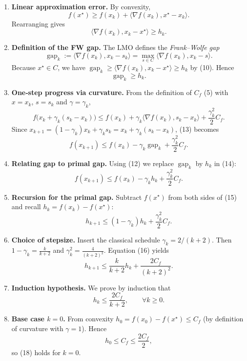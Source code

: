 \documentclass{article}
\newcommand{\gap}{\operatorname{gap}}
\begin{document}
\begin{enumerate}[label=[Step \arabic*],leftmargin=*]
\item \textbf{Linear approximation error.} By convexity,
\[
f(x^{\star})\ge f(x_{k})+\langle\nabla f(x_{k}),x^{\star}-x_{k}\rangle.
\tag{9}
\]
Rearranging gives
\[
\langle\nabla f(x_{k}),x_{k}-x^{\star}\rangle\ge h_{k}.
\tag{10}
\]

\item \textbf{Definition of the FW gap.} The LMO defines the \emph{Frank–Wolfe gap}
\[
\gap_{k}:=\langle\nabla f(x_{k}),x_{k}-s_{k}\rangle
          =\max_{s\in C}\langle\nabla f(x_{k}),x_{k}-s\rangle .
\tag{11}
\]
Because $x^{\star}\in C$, we have $\gap_{k}\ge\langle\nabla f(x_{k}),x_{k}-x^{\star}\rangle\ge h_{k}$ by (10). Hence
\[
\gap_{k}\ge h_{k}.
\tag{12}
\]

\item \textbf{One‑step progress via curvature.} From the definition of $C_{f}$ (5) with $x=x_{k}$, $s=s_{k}$ and $\gamma=\gamma_{k}$,
\[
f\big(x_{k}+\gamma_{k}(s_{k}-x_{k})\big)
\le f(x_{k})+\gamma_{k}\langle\nabla f(x_{k}),s_{k}-x_{k}\rangle
     +\frac{\gamma_{k}^{2}}{2}C_{f}.
\tag{13}
\]
Since $x_{k+1}=(1-\gamma_{k})x_{k}+\gamma_{k}s_{k}=x_{k}+\gamma_{k}(s_{k}-x_{k})$, (13) becomes
\[
f(x_{k+1})\le f(x_{k})-\gamma_{k}\gap_{k}+\frac{\gamma_{k}^{2}}{2}C_{f}.
\tag{14}
\]

\item \textbf{Relating gap to primal gap.} Using (12) we replace $\gap_{k}$ by $h_{k}$ in (14):
\[
f(x_{k+1})\le f(x_{k})-\gamma_{k}h_{k}+\frac{\gamma_{k}^{2}}{2}C_{f}.
\tag{15}
\]

\item \textbf{Recursion for the primal gap.} Subtract $f(x^{\star})$ from both sides of (15) and recall $h_{k}=f(x_{k})-f(x^{\star})$:
\[
h_{k+1}\le (1-\gamma_{k})h_{k}+\frac{\gamma_{k}^{2}}{2}C_{f}.
\tag{16}
\]

\item \textbf{Choice of stepsize.} Insert the classical schedule $\gamma_{k}=2/(k+2)$.
Then $1-\gamma_{k}= \frac{k}{k+2}$ and $\gamma_{k}^{2}= \frac{4}{(k+2)^{2}}$.
Equation (16) yields
\[
h_{k+1}\le \frac{k}{k+2}h_{k}+\frac{2C_{f}}{(k+2)^{2}}.
\tag{17}
\]

\item \textbf{Induction hypothesis.} We prove by induction that
\[
h_{k}\le \frac{2C_{f}}{k+2},\qquad\forall k\ge0.
\tag{18}
\]

\item \textbf{Base case $k=0$.} From convexity $h_{0}=f(x_{0})-f(x^{\star})\le C_{f}$ (by definition of curvature with $\gamma=1$). Hence
\[
h_{0}\le C_{f}\le \frac{2C_{f}}{2},
\]
so (18) holds for $k=0$.


\end{enumerate}
\end{document}
